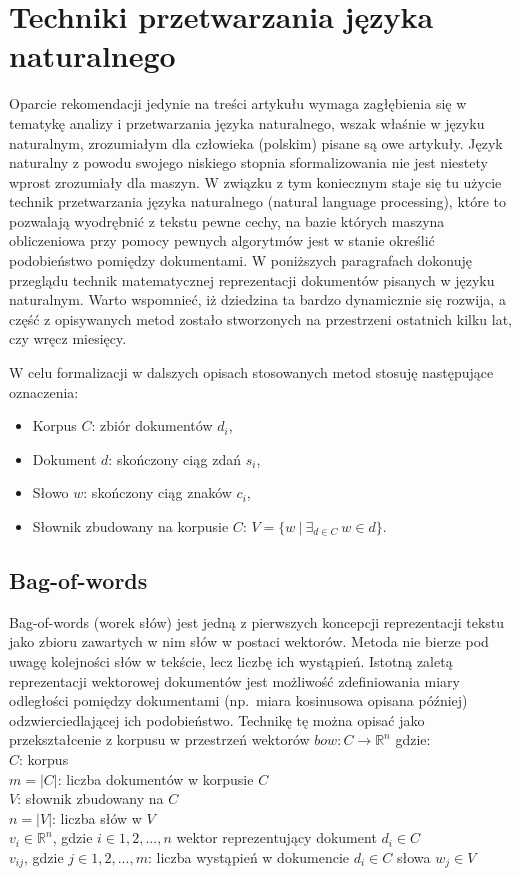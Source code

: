 \documentclass[pl]{minipw} %
\begin{document}
\section{Techniki przetwarzania języka naturalnego}
Oparcie rekomendacji jedynie na treści artykułu wymaga zagłębienia się w tematykę analizy i przetwarzania języka naturalnego, wszak właśnie w języku naturalnym, zrozumiałym dla człowieka (polskim) pisane są owe artykuły. Język naturalny z powodu swojego niskiego stopnia sformalizowania nie jest niestety wprost zrozumiały dla maszyn. W związku z tym koniecznym staje się tu użycie technik przetwarzania języka naturalnego (natural language processing), które to pozwalają wyodrębnić z tekstu pewne cechy, na bazie których maszyna obliczeniowa przy pomocy pewnych algorytmów jest w stanie określić podobieństwo pomiędzy dokumentami. W poniższych paragrafach dokonuję przeglądu technik matematycznej reprezentacji dokumentów pisanych w języku naturalnym. Warto wspomnieć, iż dziedzina ta bardzo dynamicznie się rozwija, a część z opisywanych metod zostało stworzonych na przestrzeni ostatnich kilku lat, czy wręcz miesięcy.

W celu formalizacji w dalszych opisach stosowanych metod stosuję następujące oznaczenia:
\begin{itemize}
	\item Korpus $C$: zbiór dokumentów $d_i$,
	\item Dokument $d$: skończony ciąg zdań $s_i$,
	\item Słowo $w$: skończony ciąg znaków $c_i$,
	\item Słownik zbudowany na korpusie $C$: $V = \{w\ |\ \exists_{d \in C}\ w \in d\}$.
\end{itemize}

\subsection{Bag-of-words}
Bag-of-words (worek słów) \cite{bow} jest jedną z pierwszych koncepcji reprezentacji tekstu jako zbioru zawartych w nim słów w postaci wektorów. Metoda nie bierze pod uwagę kolejności słów w tekście, lecz liczbę ich wystąpień. Istotną zaletą reprezentacji wektorowej dokumentów jest możliwość zdefiniowania miary odległości pomiędzy dokumentami (np.~miara kosinusowa opisana później) odzwierciedlającej ich podobieństwo. Technikę tę można opisać jako przekształcenie z korpusu w przestrzeń wektorów $ bow: C \to \mathbb{R}^n $ gdzie:\\
$C$: korpus\\
$m = |C|$: liczba dokumentów w korpusie $C$\\
$V$: słownik zbudowany na $C$\\
$n = |V|$: liczba słów w $V$\\
$v_i \in \mathbb{R}^n$, gdzie $i \in 1, 2, ..., n$ wektor reprezentujący dokument $d_i \in C$\\
$v_{ij}$, gdzie $j \in 1, 2, ..., m$: liczba wystąpień w dokumencie  $d_i \in C$ słowa $w_j \in V$\\
\end{document}
